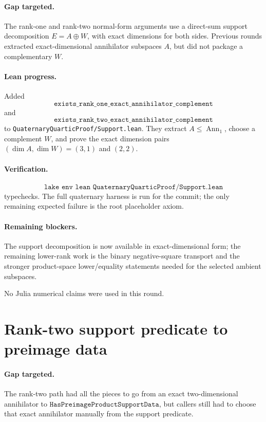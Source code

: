 \documentclass[11pt]{article}
\begin{document}
\paragraph{Gap targeted.}
The rank-one and rank-two normal-form arguments use a direct-sum support
decomposition \(E=A\oplus W\), with exact dimensions for both sides.  Previous
rounds extracted exact-dimensional annihilator subspaces \(A\), but did not
package a complementary \(W\).

\paragraph{Lean progress.}
Added
\[
\texttt{exists\_rank\_one\_exact\_annihilator\_complement}
\]
and
\[
\texttt{exists\_rank\_two\_exact\_annihilator\_complement}
\]
to \texttt{QuaternaryQuarticProof/Support.lean}.  They extract \(A\le
\operatorname{Ann}_1\), choose a complement \(W\), and prove the exact
dimension pairs \((\dim A,\dim W)=(3,1)\) and \((2,2)\).

\paragraph{Verification.}
\[
\texttt{lake env lean QuaternaryQuarticProof/Support.lean}
\]
typechecks.  The full quaternary harness is run for the commit; the only
remaining expected failure is the root placeholder axiom.

\paragraph{Remaining blockers.}
The support decomposition is now available in exact-dimensional form; the
remaining lower-rank work is the binary negative-square transport and the
stronger product-space lower/equality statements needed for the selected
ambient subspaces.

No Julia numerical claims were used in this round.

\section*{Rank-two support predicate to preimage data}

\paragraph{Gap targeted.}
The rank-two path had all the pieces to go from an exact two-dimensional
annihilator to \(\texttt{HasPreimageProductSupportData}\), but callers still
had to choose that exact annihilator manually from the support predicate.
\end{document}
